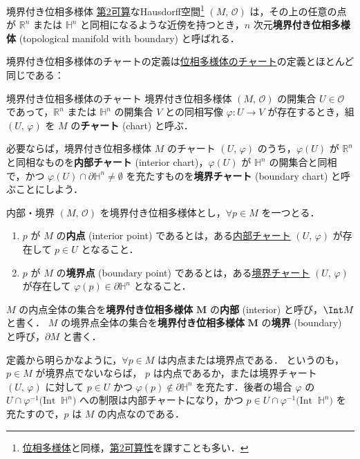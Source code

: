 \documentclass[geometry_main]{subfiles}
\begin{document}
\begin{mydef}[label=def:mani-with-boundary]{境界付き位相多様体}
	\hyperref[def:second-countable]{第2可算}なHausdorff空間\footnote{\hyperref[def.topomani]{位相多様体}と同様，\hyperref[def:second-countable]{第2可算性}を課すことも多い．} $(M,\, \mathscr{O})$ は，その上の任意の点が $\mathbb{R}^n$ または $\mathbb{H}^n$ と同相になるような近傍を持つとき，$n$ 次元\textbf{境界付き位相多様体} (topological manifold with boundary) と呼ばれる．
\end{mydef}
境界付き位相多様体のチャートの定義は\hyperref[def.localcoord]{位相多様体のチャート}の定義とほとんど同じである：

\begin{mydef}[]{境界付き位相多様体のチャート}
	境界付き位相多様体 $(M,\, \mathscr{O})$ の開集合 $U \in \mathscr{O}$ であって，$\mathbb{R}^n$ または $\mathbb{H}^n$ の開集合 $V$ との同相写像 $\varphi \colon U \to V$ が存在するとき，組 $(U,\, \varphi)$ を $M$ の\textbf{チャート} (chart) と呼ぶ． 
\end{mydef}

必要ならば，境界付き位相多様体 $M$ のチャート $(U,\, \varphi)$ のうち，$\varphi(U)$ が $\mathbb{R}^n$ と同相なものを\textbf{内部チャート} (interior chart)，$\varphi(U)$ が $\mathbb{H}^n$ の開集合と同相で，かつ $\varphi(U) \cap \partial \mathbb{H}^n \neq \emptyset$ を充たすものを\textbf{境界チャート} (boundary chart) と呼ぶことにしよう．

\begin{mydef}[label=def:int-manifold-with-boundary]{内部・境界}
	$(M,\, \mathscr{O})$ を境界付き位相多様体とし，$\forall p \in M$ を一つとる．
	\begin{enumerate}
		\item $p$ が $M$ の\textbf{内点} (interior point) であるとは，ある\underline{内部チャート} $(U,\, \varphi)$ が存在して $p \in U$ となること．
		\item $p$ が $M$ の\textbf{境界点} (boundary point) であるとは，ある\underline{境界チャート} $(U,\, \varphi)$ が存在して $\varphi(p) \in \partial \mathbb{H}^n$ となること．
	\end{enumerate}
	$M$ の内点全体の集合を\textbf{境界付き位相多様体} $\bm{M}$ の\textbf{内部} (interior) と呼び，$\Int M$ と書く．
	$M$ の境界点全体の集合を\textbf{境界付き位相多様体} $\bm{M}$ の\textbf{境界} (boundary) と呼び，$\partial M$ と書く．
\end{mydef}

定義から明らかなように，$\forall p \in M$ は内点または境界点である．
というのも，$p \in M$ が境界点でないならば， $p$ は内点であるか，または境界チャート $(U,\, \varphi)$ に対して $p \in U$ かつ $\varphi(p) \notin \partial \mathbb{H}^n$ を充たす．後者の場合 $\varphi$ の $U \cap \varphi^{-1}\bigl(\mathrm{Int}\mathop{} \mathbb{H}^n\bigr)$ への制限は内部チャートになり，かつ $p \in U \cap \varphi^{-1}\bigl(\mathrm{Int}\mathop{} \mathbb{H}^n\bigr)$ を充たすので，$p$ は $M$ の内点なのである．
\end{document}
